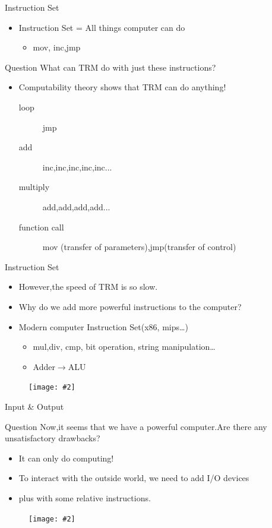 \documentclass{beamer}
\newcommand{\fignocaption}[2]{
	\begin{figure}[htp]
		\centering
		\texttt{[image: \#2]}
	\end{figure}
}
\begin{document}
\begin{frame}{Instruction Set}
	\begin{itemize}
		\item \alert{Instruction Set = All things computer can do}
		\begin{itemize}
			\item	mov, inc,jmp
		\end{itemize}

\end{itemize}

\begin{block}{Question}
	What can TRM do with just these instructions?
\end{block}
\pause
\begin{itemize}
		\item Computability theory shows that TRM can do anything!
		\begin{description}
			\item [loop]  jmp
			\item [add] inc,inc,inc,inc,inc...
			\item [multiply] add,add,add,add... 
			\item [function call] mov (transfer of parameters),jmp(transfer of control)
		\end{description}
		
	\end{itemize}
	
\end{frame}

\begin{frame}{Instruction Set}
	\begin{itemize}
		\item However,the speed of TRM is so slow.
		\item Why do we add more powerful instructions to the computer?
		\item \alert{Modern computer Instruction Set}(x86, mips…)
		\begin{itemize}
			\item mul,div, cmp, bit operation, string manipulation…
			\item Adder$\longrightarrow$ALU 
		\end{itemize}

	\end{itemize}
	\fignocaption{scale=0.4}{modernisa.png}
\end{frame}

\begin{frame}{Input \& Output}
	\begin{block}{Question}
		Now,it seems that we have a powerful computer.Are there any unsatisfactory drawbacks?
	\end{block}
	\begin{itemize}
		\pause
		\item It can only do computing!
		\item To interact with the outside world, \alert{we need to add I/O devices}
		\item plus with some relative instructions.
	\end{itemize}
	
	\fignocaption{scale=0.4}{io.png}
\end{frame}
\end{document}

